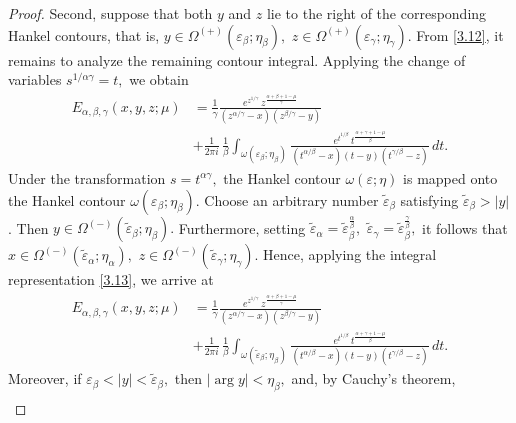 \documentclass[12pt, reqno]{amsart}
\theoremstyle{definition}
\theoremstyle{remark}
\numberwithin{equation}{section}
\begin{document}
\begin{proof}
Second, suppose that both $y$ and $z$ lie to the right of the corresponding Hankel contours, that is,
$
y\in\Omega^{(+)}(\varepsilon_\beta;\eta_\beta),
\,\,
z\in\Omega^{(+)}(\varepsilon_\gamma;\eta_\gamma).
$
From \eqref{3.12}, it remains to analyze the remaining contour integral. Applying the change of variables
$
s^{1/\alpha\gamma}=t,
$
we obtain
\begin{equation}\label{3.13}\begin{aligned}
E_{\alpha,\beta,\gamma}(x,y,z;\mu)
&=\frac{1}{\gamma}\frac{
e^{z^{1/\gamma}}
\,z^{\frac{\alpha+\beta+1-\mu}{\gamma}}}
{(z^{\alpha/\gamma}-x)(z^{\beta/\gamma}-y)}\\
&+
\frac{1}{2\pi i}\,
\frac{1}{\beta}
\int_{\omega(\varepsilon_\beta;\eta_\beta)}
\frac{
e^{t^{1/\beta}}
\,t^{\frac{\alpha+\gamma+1-\mu}{\beta}}
}
{
(t^{\alpha/\beta}-x)(t-y)(t^{\gamma/\beta}-z)
}
\,dt.\end{aligned}\end{equation}
Under the transformation
$
s=t^{\alpha\gamma},
$
the Hankel contour
$
\omega(\varepsilon;\eta)
$
is mapped onto the Hankel contour
$
\omega(\varepsilon_\beta;\eta_\beta).
$ Choose an arbitrary number $\widetilde{\varepsilon}_{\beta}$ satisfying
$\widetilde{\varepsilon}_{\beta}>|y|$. Then
$
y\in\Omega^{(-)}(\widetilde{\varepsilon}_{\beta};\eta_\beta).
$
Furthermore, setting
$
\widetilde{\varepsilon}_{\alpha}
=\widetilde{\varepsilon}_{\beta}^{\frac{\alpha}{\beta}},
\,\,
\widetilde{\varepsilon}_{\gamma}
=\widetilde{\varepsilon}_{\beta}^{\frac{\gamma}{\beta}},
$
it follows that
$
x\in\Omega^{(-)}(\widetilde{\varepsilon}_{\alpha};\eta_\alpha),
\,\,
z\in\Omega^{(-)}(\widetilde{\varepsilon}_{\gamma};\eta_\gamma).
$ Hence, applying the integral representation \eqref{3.13}, we arrive at
\begin{equation}\label{3.14}\begin{aligned}
E_{\alpha,\beta,\gamma}(x,y,z;\mu)
&=\frac{1}{\gamma}\frac{
e^{z^{1/\gamma}}
\,z^{\frac{\alpha+\beta+1-\mu}{\gamma}}}
{(z^{\alpha/\gamma}-x)(z^{\beta/\gamma}-y)}\\
&+
\frac{1}{2\pi i}\,
\frac{1}{\beta}
\int_{\omega(\widetilde{\varepsilon}_{\beta};\eta_\beta)}
\frac{
e^{t^{1/\beta}}
\,t^{\frac{\alpha+\gamma+1-\mu}{\beta}}
}
{
(t^{\alpha/\beta}-x)(t-y)(t^{\gamma/\beta}-z)
}
\,dt.\end{aligned}\end{equation}
Moreover, if
$
\varepsilon_\beta<|y|<\widetilde{\varepsilon}_{\beta},
$
then
$
|\arg y|<\eta_\beta,
$
and, by Cauchy's theorem,
\begin{equation}\label{3.15}\begin{aligned}

\end{aligned}
\end{equation}
\end{proof}
\end{document}
